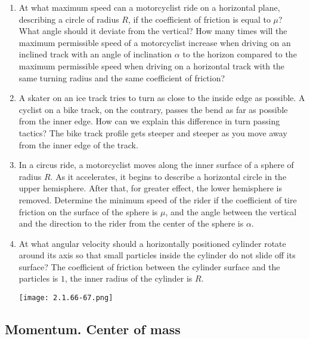 \documentclass{article}
\begin{document}
\begin{enumerate}[label=2.1.\arabic*]
\item At what maximum speed can a motorcyclist ride on a horizontal plane, describing a circle of radius $R$, if the coefficient of friction is equal to $\mu$? What angle should it deviate from the vertical? How many times will the maximum permissible speed of a motorcyclist increase when driving on an inclined track with an angle of inclination $\alpha$ to the horizon compared to the maximum permissible speed when driving on a horizontal track with the same turning radius and the same coefficient of friction?

\item A skater on an ice track tries to turn as close to the inside edge as possible. A cyclist on a bike track, on the contrary, passes the bend as far as possible from the inner edge. How can we explain this difference in turn passing tactics? The bike track profile gets steeper and steeper as you move away from the inner edge of the track.

\item In a circus ride, a motorcyclist moves along the inner surface of a sphere of radius $R$. As it accelerates, it begins to describe a horizontal circle in the upper hemisphere. After that, for greater effect, the lower hemisphere is removed. Determine the minimum speed of the rider if the coefficient of tire friction on the surface of the sphere is $\mu$, and the angle between the vertical and the direction to the rider from the center of the sphere is $\alpha$.

\item At what angular velocity should a horizontally positioned cylinder rotate around its axis so that small particles inside the cylinder do not slide off its surface? The coefficient of friction between the cylinder surface and the particles is $1$, the inner radius of the cylinder is $R$.

\begin{center}
    \texttt{[image: 2.1.66-67.png]}
\end{center}



\end{enumerate}

\subsection{Momentum. Center of mass}
\end{document}
